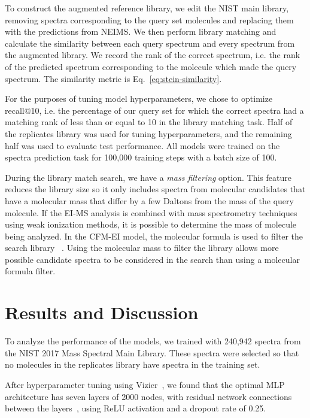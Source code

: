 \documentclass{article}
\begin{document}
To construct the augmented reference library, we edit the NIST main library, removing spectra corresponding to the query set molecules and replacing them with the predictions from NEIMS. 
We then perform library matching and calculate the similarity between each query spectrum and every spectrum from the augmented library. We record the rank of the correct spectrum, i.e. the rank of the predicted spectrum corresponding to the molecule which made the query spectrum. The similarity metric is Eq.~\eqref{eq:stein-similarity}.

For the purposes of tuning model hyperparameters, we chose to optimize recall@10, i.e. the percentage of our query set for which the correct spectra had a matching rank of less than or equal to 10 in the library matching task. Half of the replicates library was used for tuning hyperparameters, and the remaining half was used to evaluate test performance. All models were trained on the spectra prediction task for 100,000 training steps with a batch size of 100.

During the library match search, we have a \textit{mass filtering} option. This feature reduces the library size so it only includes spectra from molecular candidates that have a molecular mass that differ by a few Daltons from the mass of the query molecule.
If the EI-MS analysis is combined with mass spectrometry techniques using weak ionization methods, it is possible to determine the mass of molecule being analyzed. In the CFM-EI model, the molecular formula is used to filter the search library
~\cite{allen2016computational}. Using the molecular mass to filter the library allows more possible candidate spectra to be considered in the search than using a molecular formula filter.

\section{Results and Discussion}

To analyze the performance of the models, we trained with 240,942 spectra from the NIST 2017 Mass Spectral Main Library. These spectra were selected so that no molecules in the replicates library have spectra in the training set.

After hyperparameter tuning using Vizier~\cite{Google_Vizier}, we found that the optimal MLP architecture has seven layers of 2000 nodes, with residual network connections between the layers~\cite{he_resnet}, using ReLU activation and a dropout rate of 0.25. 
\end{document}
